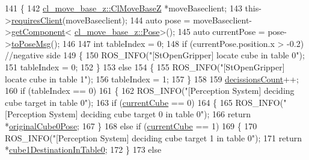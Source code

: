\begin{DoxyCode}
141     \{
142         \hyperlink{classcl__move__base__z_1_1ClMoveBaseZ}{cl\_move\_base\_z::ClMoveBaseZ} *moveBaseclient;
143         this->\hyperlink{classsmacc_1_1ISmaccClient_a7a9990a2f3e35d547671188d69fee520}{requiresClient}(moveBaseclient);
144         \textcolor{keyword}{auto} pose = moveBaseclient->\hyperlink{classsmacc_1_1ISmaccClient_adef78db601749ca63c19e74a27cb88cc}{getComponent}<
      \hyperlink{classcl__move__base__z_1_1Pose}{cl\_move\_base\_z::Pose}>();
145         \textcolor{keyword}{auto} currentPose = pose->\hyperlink{classcl__move__base__z_1_1Pose_a9faf8c6b437ff6b19c8bddd692908dca}{toPoseMsg}();
146 
147         \textcolor{keywordtype}{int} tableIndex = 0;
148         \textcolor{keywordflow}{if} (currentPose.position.x > -0.2) \textcolor{comment}{//negative side}
149         \{
150             ROS\_INFO(\textcolor{stringliteral}{"[StOpenGripper] locate cube in table 0"});
151             tableIndex = 0;
152         \}
153         \textcolor{keywordflow}{else}
154         \{
155             ROS\_INFO(\textcolor{stringliteral}{"[StOpenGripper] locate cube in table 1"});
156             tableIndex = 1;
157         \}
158 
159         \hyperlink{classsm__moveit_1_1cl__perception__system_1_1ClPerceptionSystem_ab8272ccb5af7401beeb4e9eaf1d86fa3}{decissionsCount}++;
160         \textcolor{keywordflow}{if} (tableIndex == 0)
161         \{
162             ROS\_INFO(\textcolor{stringliteral}{"[Perception System] deciding cube target in table 0"});
163             \textcolor{keywordflow}{if} (\hyperlink{classsm__moveit_1_1cl__perception__system_1_1ClPerceptionSystem_a0ffeadfa41480c9d4d0fcc509237dff6}{currentCube} == 0)
164             \{
165                 ROS\_INFO(\textcolor{stringliteral}{"[Perception System] deciding cube target 0 in table 0"});
166                 \textcolor{keywordflow}{return} *\hyperlink{classsm__moveit_1_1cl__perception__system_1_1ClPerceptionSystem_a763b8723ae96eb30fd21e039e3f52c47}{originalCube0Pose};
167             \}
168             \textcolor{keywordflow}{else} \textcolor{keywordflow}{if} (\hyperlink{classsm__moveit_1_1cl__perception__system_1_1ClPerceptionSystem_a0ffeadfa41480c9d4d0fcc509237dff6}{currentCube} == 1)
169             \{
170                 ROS\_INFO(\textcolor{stringliteral}{"[Perception System] deciding cube target 1 in table 0"});
171                 \textcolor{keywordflow}{return} *\hyperlink{classsm__moveit_1_1cl__perception__system_1_1ClPerceptionSystem_a13cf34b1fb711829c4ddb9a9e2899ae9}{cube1DestinationInTable0};
172             \}
173             \textcolor{keywordflow}{else}

\end{DoxyCode}

